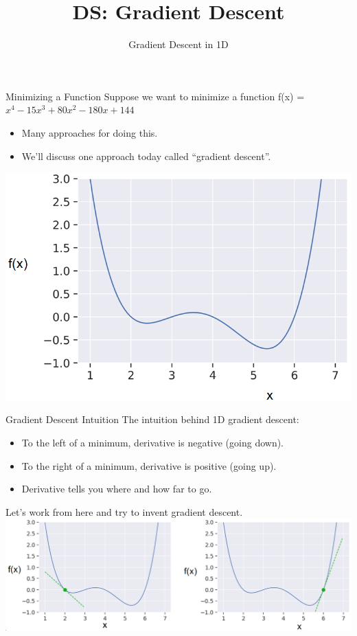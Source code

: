\documentclass[aspectratio=169]{../latex_main/tntbeamer}  %
\title[Introduction]{DS: Gradient Descent}
\subtitle{Gradient Descent in 1D}
\begin{document}
	
	\maketitle
	\begin{frame}{Minimizing a Function}
	    Suppose we want to minimize a function f(x) = $x^4 -15x^3 + 80x^2 - 180x +144$
	    \begin{itemize}
	        \item Many approaches for doing this.
	        \item We’ll discuss one approach today called “gradient descent”.
	    \end{itemize}
	    \centering
	    \includegraphics[scale=.38]{Bild1}
	\end{frame}
	
	
	
	\begin{frame}{Gradient Descent Intuition}
	    The intuition behind 1D gradient descent: 
	    \begin{itemize}
	        \item To the left of a minimum, derivative is negative (going down).
	        \item To the right of a minimum, derivative is positive (going up).
	        \item Derivative tells you where and how far to go.
	    \end{itemize}
	    Let’s work from here and try to invent gradient descent.\\
	    \centering
	    \includegraphics[scale=.38]{Bild2}
	\end{frame}
	
\end{document}
